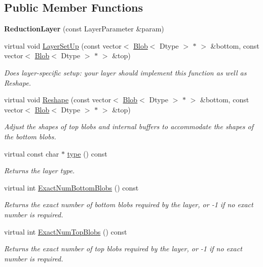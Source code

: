\subsection*{Public Member Functions}
\begin{DoxyCompactItemize}
\item 
{\bfseries Reduction\+Layer} (const Layer\+Parameter \&param)\hypertarget{classcaffe_1_1ReductionLayer_aefb1d51cf2b4ce4248d9614267191e4d}{}\label{classcaffe_1_1ReductionLayer_aefb1d51cf2b4ce4248d9614267191e4d}

\item 
virtual void \hyperlink{classcaffe_1_1ReductionLayer_adcaa5d98dbc93778e2f208c1a62706f0}{Layer\+Set\+Up} (const vector$<$ \hyperlink{classcaffe_1_1Blob}{Blob}$<$ Dtype $>$ $\ast$ $>$ \&bottom, const vector$<$ \hyperlink{classcaffe_1_1Blob}{Blob}$<$ Dtype $>$ $\ast$ $>$ \&top)
\begin{DoxyCompactList}\small\item\em Does layer-\/specific setup\+: your layer should implement this function as well as Reshape. \end{DoxyCompactList}\item 
virtual void \hyperlink{classcaffe_1_1ReductionLayer_a0c4d8dc5ccf4240875c47140bcfa265c}{Reshape} (const vector$<$ \hyperlink{classcaffe_1_1Blob}{Blob}$<$ Dtype $>$ $\ast$ $>$ \&bottom, const vector$<$ \hyperlink{classcaffe_1_1Blob}{Blob}$<$ Dtype $>$ $\ast$ $>$ \&top)
\begin{DoxyCompactList}\small\item\em Adjust the shapes of top blobs and internal buffers to accommodate the shapes of the bottom blobs. \end{DoxyCompactList}\item 
virtual const char $\ast$ \hyperlink{classcaffe_1_1ReductionLayer_a4aa2a42c87cee718b938e37f91badac2}{type} () const \hypertarget{classcaffe_1_1ReductionLayer_a4aa2a42c87cee718b938e37f91badac2}{}\label{classcaffe_1_1ReductionLayer_a4aa2a42c87cee718b938e37f91badac2}

\begin{DoxyCompactList}\small\item\em Returns the layer type. \end{DoxyCompactList}\item 
virtual int \hyperlink{classcaffe_1_1ReductionLayer_ae867c60a3ff94496f9a375b606c00bd3}{Exact\+Num\+Bottom\+Blobs} () const 
\begin{DoxyCompactList}\small\item\em Returns the exact number of bottom blobs required by the layer, or -\/1 if no exact number is required. \end{DoxyCompactList}\item 
virtual int \hyperlink{classcaffe_1_1ReductionLayer_ada0483efdbad3a50f6fc8466cef482bd}{Exact\+Num\+Top\+Blobs} () const 
\begin{DoxyCompactList}\small\item\em Returns the exact number of top blobs required by the layer, or -\/1 if no exact number is required. \end{DoxyCompactList}\end{DoxyCompactItemize}
